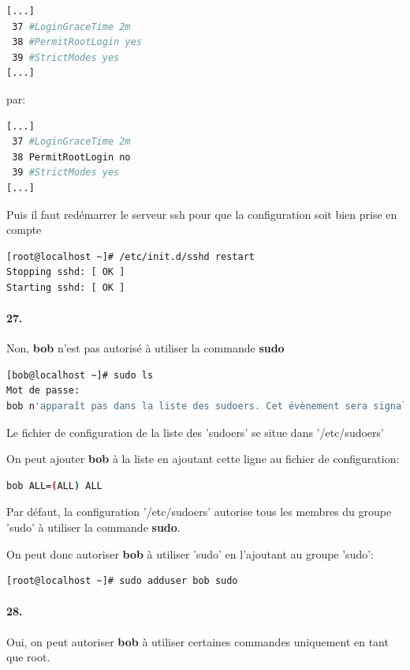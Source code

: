 \documentclass[10pt]{article}
\begin{document}
\begin{lstlisting}[language=bash]
[...]
 37 #LoginGraceTime 2m
 38 #PermitRootLogin yes
 39 #StrictModes yes
[...]
\end{lstlisting}

    par:
    
\begin{lstlisting}[language=bash]
[...]
 37 #LoginGraceTime 2m
 38 PermitRootLogin no
 39 #StrictModes yes
[...]
\end{lstlisting}

Puis il faut redémarrer le serveur ssh pour que la configuration soit bien prise en compte
\begin{lstlisting}[language=bash]
[root@localhost ~]# /etc/init.d/sshd restart
Stopping sshd: [ OK ]
Starting sshd: [ OK ]
\end{lstlisting}


    \paragraph{27.} Non, \textbf{bob} n'est pas autorisé à utiliser la commande \textbf{sudo}
    
\begin{lstlisting}[language=bash]
[bob@localhost ~]# sudo ls
Mot de passe:
bob n'apparaît pas dans la liste des sudoers. Cet évènement sera signalé.
\end{lstlisting}

Le fichier de configuration de la liste des 'sudoers' se situe dans '/etc/sudoers'

On peut ajouter \textbf{bob} à la liste en ajoutant cette ligne au fichier de configuration:

\begin{lstlisting}[language=bash]
bob ALL=(ALL) ALL
\end{lstlisting}

Par défaut, la configuration '/etc/sudoers' autorise tous les membres du groupe 'sudo' à utiliser la commande \textbf{sudo}.

On peut donc autoriser \textbf{bob} à utiliser 'sudo' en l'ajoutant au groupe 'sudo':

\begin{lstlisting}[language=bash]
[root@localhost ~]# sudo adduser bob sudo
\end{lstlisting}

    \paragraph{28.}
    Oui, on peut autoriser \textbf{bob} à utiliser certaines commandes uniquement en tant que root.
    
\end{document}
